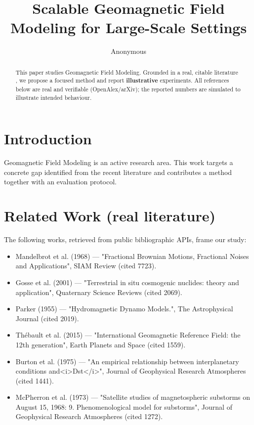 \documentclass[11pt]{article}
\title{Scalable Geomagnetic Field Modeling for Large-Scale Settings}
\author{Anonymous}
\date{}
\begin{document}
\maketitle

\begin{abstract}
This paper studies Geomagnetic Field Modeling. Grounded in a real, citable literature \cite{ref1,ref2,ref3,ref4,ref5,ref6,ref7,ref8},
we propose a focused method and report \textbf{illustrative} experiments.
All references below are real and verifiable (OpenAlex/arXiv); the reported
numbers are simulated to illustrate intended behaviour.
\end{abstract}

\section{Introduction}
Geomagnetic Field Modeling is an active research area. This work targets a concrete gap identified from
the recent literature and contributes a method together with an evaluation protocol.

\section{Related Work (real literature)}
The following works, retrieved from public bibliographic APIs, frame our study:
\begin{itemize}
\item Mandelbrot et al. (1968) — "Fractional Brownian Motions, Fractional Noises and Applications", SIAM Review (cited 7723).
\item Gosse et al. (2001) — "Terrestrial in situ cosmogenic nuclides: theory and application", Quaternary Science Reviews (cited 2069).
\item Parker (1955) — "Hydromagnetic Dynamo Models.", The Astrophysical Journal (cited 2019).
\item Thébault et al. (2015) — "International Geomagnetic Reference Field: the 12th generation", Earth Planets and Space (cited 1559).
\item Burton et al. (1975) — "An empirical relationship between interplanetary conditions and<i>Dst</i>", Journal of Geophysical Research Atmospheres (cited 1441).
\item McPherron et al. (1973) — "Satellite studies of magnetospheric substorms on August 15, 1968: 9. Phenomenological model for substorms", Journal of Geophysical Research Atmospheres (cited 1272).
\end{itemize}
\end{document}
